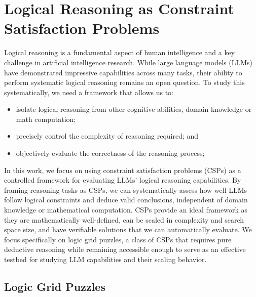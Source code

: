 \vspace{-0.2cm}
\section{Logical Reasoning as Constraint Satisfaction Problems}
\label{sec:background}
\vspace{-0.2cm}

Logical reasoning is a fundamental aspect of human intelligence and a key challenge in artificial intelligence research. While large language models (LLMs) have demonstrated impressive capabilities across many tasks, their ability to perform systematic logical reasoning remains an open question. To study this systematically, we need a framework that allows us to:
\begin{itemize}[leftmargin=*,itemsep=0pt,parsep=0pt,topsep=0pt,partopsep=0pt]
    \item isolate logical reasoning from other cognitive abilities, domain knowledge or math computation;
    \item precisely control the complexity of reasoning required; and
    \item objectively evaluate the correctness of the reasoning process;
\end{itemize}

In this work, we focus on using constraint satisfaction problems (CSPs) as a controlled framework for evaluating LLMs' logical reasoning capabilities. By framing reasoning tasks as CSPs, we can systematically assess how well LLMs follow logical constraints and deduce valid conclusions, independent of domain knowledge or mathematical computation.
CSPs provide an ideal framework as they are mathematically well-defined, can be scaled in complexity and search space size, and have verifiable solutions that we can automatically evaluate. 
We focus specifically on logic grid puzzles, a class of CSPs that requires pure deductive reasoning while remaining accessible enough to serve as an effective testbed for studying LLM capabilities and their scaling behavior.


\subsection{Logic Grid Puzzles}



